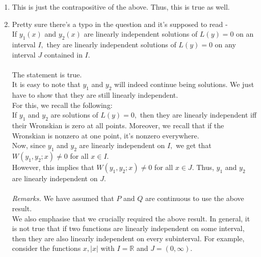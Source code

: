 \documentclass[12pt]{article}
\theoremstyle{definition}
\numberwithin{thm}{section}
\begin{document}
\begin{enumerate}[leftmargin=*, label = Q.\arabic*.]
\begin{enumerate}[label = (\roman*)]
\begin{proof}
			We show that this is possible only if $\alpha = \beta = 0.$ This will prove linear independence.\\
			From (\ref{eq:linJ}), we can deduce that
			\begin{equation} \label{eq:linI}
			\alpha y_1(x) + \beta y_2(x) = 0 \quad \forall x \in I.
			\end{equation}
			(Why?)\\
			However, $y_1$ and $y_2$ were assumed to be linearly independent on $I.$ Thus, from (\ref{eq:linI}), we can conclude that $\alpha = \beta = 0,$ as desired.
		\end{proof}
		\item This is just the contrapositive of the above. Thus, this is true as well.
		\item Pretty sure there's a typo in the question and it's supposed to read -\\
		If $y_1(x)$ and $y_2(x)$ are linearly independent solutions of $L(y) = 0$ on an interval $I,$ they are linearly independent solutions of $L(y) = 0$ on any interval $J$ contained in $I.$\\\\
		The statement is true.\\
		It is easy to note that $y_1$ and $y_2$ will indeed continue being solutions. We just have to show that they are still linearly independent.\\
		For this, we recall the following:\\
		If $y_1$ and $y_2$ are solutions of $L(y) = 0,$ then they are linearly independent iff their Wronskian is zero at all points. Moreover, we recall that if the Wronskian is nonzero at one point, it's nonzero everywhere.\\
		Now, since $y_1$ and $y_2$ are linearly independent on $I,$ we get that $W(y_1, y_2;x) \neq 0$ for all $x \in I.$\\
		However, this implies that $W(y_1, y_2;x) \neq 0$ for all $x \in J.$ Thus, $y_1$ and $y_2$ are linearly independent on $J.$\\\\
		\emph{Remarks.} We have assumed that $P$ and $Q$ are continuous to use the above result.\\
		We also emphasise that we crucially required the above result. In general, it is not true that if two functions are linearly independent on some interval, then they are also linearly independent on every subinterval. For example, consider the functions $x, |x|$ with $I = \mathbb{R}$ and $J = (0, \infty).$

\end{enumerate}
\end{enumerate}
\end{document}
